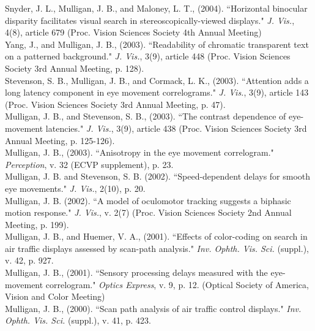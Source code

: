 \documentclass[12pt]{article}
\newcommand{\years}[1]{\marginnote{\scriptsize #1}}
\begin{document}
Snyder, J. L., Mulligan, J. B., and Maloney, L. T., (2004).
``Horizontal binocular disparity facilitates visual search
in stereoscopically-viewed displays."
\emph{J. Vis.}, 4(8), article 679
(Proc. Vision Sciences Society 4th Annual Meeting)\\

\years{2003}
Yang, J., and Mulligan, J. B., (2003).
``Readability of chromatic transparent text on a patterned background."
\emph{J. Vis.}, 3(9), article 448
(Proc. Vision Sciences Society 3rd Annual Meeting, p. 128).\\

Stevenson, S. B., Mulligan, J. B., and Cormack, L. K., (2003).
``Attention adds a long latency component in eye movement correlograms."
\emph{J. Vis.}, 3(9), article 143
(Proc. Vision Sciences Society 3rd Annual Meeting, p. 47).\\

Mulligan, J. B., and Stevenson, S. B., (2003).
``The contrast dependence of eye-movement latencies."
\emph{J. Vis.}, 3(9), article 438
(Proc. Vision Sciences Society 3rd Annual Meeting, p. 125-126).\\

Mulligan, J. B., (2003).
``Anisotropy in the eye movement correlogram."
\emph{Perception},
v.  32 (ECVP supplement), p. 23.\\

\years{2002}
Mulligan, J. B. and Stevenson, S. B. (2002).
``Speed-dependent delays for smooth eye movements."
\emph{J. Vis.}, 2(10), p. 20.\\

Mulligan, J. B. (2002).
``A model of oculomotor tracking suggests a biphasic motion response."
\emph{J. Vis.}, v. 2(7)
(Proc. Vision Sciences Society 2nd Annual Meeting, p. 199).\\

\years{2001}
Mulligan, J. B., and Huemer, V. A., (2001).
``Effects of color-coding on search in air traffic displays assessed by scan-path analysis."
\emph{Inv. Ophth. Vis. Sci.} (suppl.), v.  42, p. 927.\\

Mulligan, J. B., (2001).
``Sensory processing delays measured with the eye-movement correlogram."
\emph{Optics Express}, v.  9, p. 12.
(Optical Society of America, Vision and Color Meeting)\\

\years{2000}
Mulligan, J. B., (2000).
``Scan path analysis of air traffic control displays."
\emph{Inv. Ophth. Vis. Sci.} (suppl.), v.  41, p. 423.\\
\end{document}
